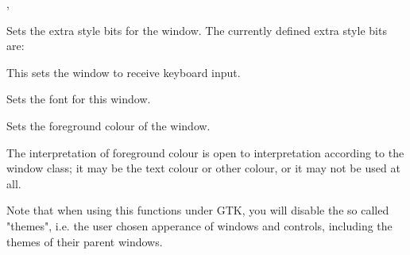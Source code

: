 
,

\label{wxwindowsetextrastyle}


Sets the extra style bits for the window. The currently defined extra style
bits are:

\twocolwidtha{5cm}%
\begin{twocollist}\itemsep=0pt
\end{twocollist}

\label{wxwindowsetfocus}


This sets the window to receive keyboard input.

\label{wxwindowsetfont}


Sets the font for this window.





\label{wxwindowsetforegroundcolour}


Sets the foreground colour of the window.




The interpretation of foreground colour is open to interpretation according
to the window class; it may be the text colour or other colour, or it may not
be used at all.

Note that when using this functions under GTK, you will disable the so called "themes",
i.e. the user chosen apperance of windows and controls, including the themes of
their parent windows.

